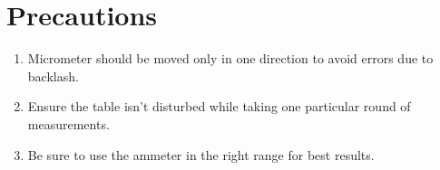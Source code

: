 \section{Precautions}
	\begin{enumerate}		
		\item Micrometer should be moved only in one direction to avoid errors due to backlash.
		\item Ensure the table isn't disturbed while taking one particular round of measurements.
		\item Be sure to use the ammeter in the right range for best results.
	\end{enumerate}